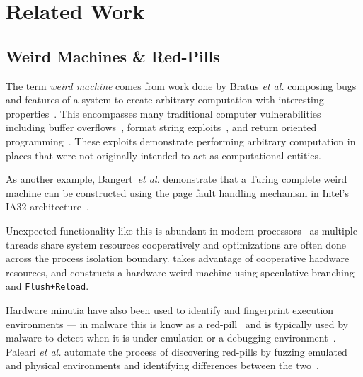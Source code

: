 
\section{Related Work}
\label{sec:related-work}


\subsection{Weird Machines \& Red-Pills}


The term \textit{weird machine} comes from work done by Bratus \textit{et al.}
composing bugs and features of a system to create arbitrary computation with
interesting properties~\cite{weird_machines,bratus2011exploit,weird_exploits}.
This encompasses many traditional computer vulnerabilities including buffer
overflows~\cite{buffer_overflow}, format string
exploits~\cite{format_string_exploit}, and return oriented
programming~\cite{shacham2007geometry}. These exploits demonstrate performing
arbitrary computation in places that were not originally intended to act as
computational entities.

As another example, Bangert~\textit{et al.} demonstrate that a Turing complete
weird machine can be constructed using the page fault handling mechanism in
Intel's IA32 architecture~\cite{bangert2013page}. 

Unexpected functionality like this is abundant in modern
processors~\cite{d2015exploiting} as multiple threads share system resources
cooperatively and optimizations are often done across the process
isolation boundary. \speculake takes advantage of cooperative hardware
resources, and constructs a hardware weird machine
using speculative branching and \texttt{Flush+Reload}.

\smallskip

Hardware minutia have also been used to identify and fingerprint execution
environments --- in malware this is know as a red-pill~\cite{red-pill} and 
is typically used by malware to detect when it is under emulation or
a debugging environment~\cite{lindorfer2011detecting, balzarotti2010efficient}. Paleari
\textit{et al.} automate the process of discovering red-pills by
fuzzing emulated and physical environments and identifying
differences between the two~\cite{paleari2009fistful}.


